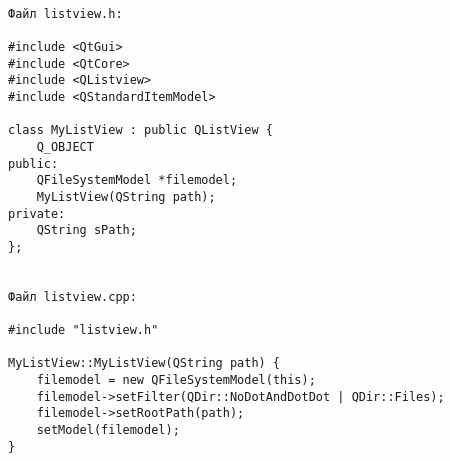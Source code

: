 \begin{verbatim}

Файл listview.h:

#include <QtGui>
#include <QtCore>
#include <QListview>
#include <QStandardItemModel>

class MyListView : public QListView {
    Q_OBJECT
public:
    QFileSystemModel *filemodel;
    MyListView(QString path);
private:
    QString sPath;
};


Файл listview.cpp:

#include "listview.h"

MyListView::MyListView(QString path) {
    filemodel = new QFileSystemModel(this);
    filemodel->setFilter(QDir::NoDotAndDotDot | QDir::Files);
    filemodel->setRootPath(path);
    setModel(filemodel);
}
\end{verbatim}
